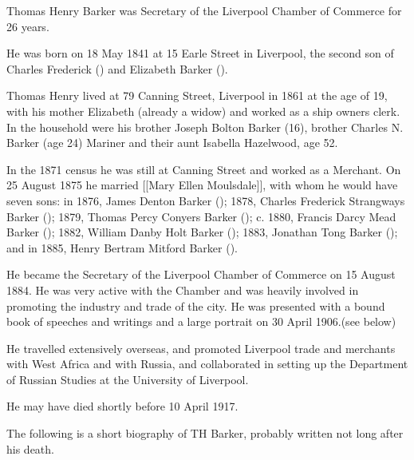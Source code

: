 
Thomas Henry Barker was Secretary of the Liverpool Chamber of Commerce for 26 years.\cite{THBbio}

He was born on 18 May 1841\cite{THBbirth} at 15 Earle Street in Liverpool,\cite{THBplantagenets} the second son of Charles Frederick () and Elizabeth Barker ().

Thomas Henry lived at 79 Canning Street, Liverpool in 1861 at the age of 19, with his mother Elizabeth (already a widow) and worked as a ship owners clerk.  In the household were his brother Joseph Bolton Barker (16), brother Charles N. Barker (age 24) Mariner and their aunt Isabella Hazelwood, age 52.

In the 1871 census he was still at Canning Street and worked as a Merchant.
On 25 August 1875 he married [[Mary Ellen Moulsdale]],\cite{THBmarriage} with whom he would have seven sons:\cite{THBplantagenets}
in 1876, James Denton Barker ();
1878, Charles Frederick Strangways Barker ();
1879, Thomas Percy Conyers Barker ();
c. 1880, Francis Darcy Mead Barker ();
1882, William Danby Holt Barker ();
1883, Jonathan Tong Barker (); and in
1885, Henry Bertram Mitford Barker ().

He became the Secretary of the Liverpool Chamber of Commerce on 15 August 1884.  He was very active with the Chamber and was heavily involved in promoting the industry and trade of the city.  He was presented with a bound book of speeches and writings and a large portrait on 30 April 1906.(see below)

He travelled extensively overseas, and promoted Liverpool trade and merchants with West Africa and with Russia, and collaborated in setting up the Department of Russian Studies at the University of Liverpool.

He may have died shortly before 10 April 1917.\cite{Echo1917, THBfreebmd}

The following is a short biography of TH Barker, probably written not long after his death. \cite{THBbio}

